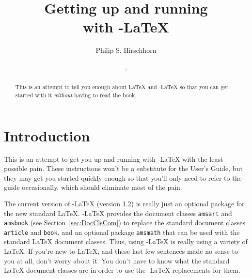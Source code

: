 \documentclass[12pt]{amsart}
\numberwithin{equation}{section}
\theoremstyle{plain} %
\theoremstyle{definition}
\theoremstyle{remark}
\begin{document}
\title[Running \AmS-\LaTeX]
{Getting up and running\\
with \AmS-\LaTeX}

\author{Philip S. Hirschhorn}

\address{Department of Mathematics\\
         Wellesley College\\
         Wellesley, Massachusetts 02481}



\date{\filedate, \fileversion}


\begin{abstract}
  This is an attempt to tell you enough about \LaTeX{} and
  \AmS-\LaTeX{} so that you can get started with it \emph{without}
  having to read the book.
\end{abstract}

\maketitle




\tableofcontents
\section{Introduction}

This is an attempt to get you up and running with \AmS-\LaTeX{} with
the least possible pain.  These instructions won't be a substitute for
the User's Guide, but they may get you started quickly enough so that
you'll only need to refer to the guide occasionally, which should
eliminate most of the pain.

The current version of \AmS-\LaTeX{} (version 1.2) is really just an
optional package for the new standard \LaTeX.  \AmS-\LaTeX{} provides
the document classes \verb"amsart" and \verb"amsbook" (see
Section~\ref{sec:DocClsCom}) to replace the standard document classes
\verb"article" and \verb"book", and an optional package \verb"amsmath"
that can be used with the standard \LaTeX{} document classes.  Thus,
using \AmS-\LaTeX{} is really using a variety of \LaTeX.  If you're
new to \LaTeX{}, and these last few sentences made no sense to you at
all, don't worry about it.  You don't have to know what the standard
\LaTeX{} document classes are in order to use the \AmS-\LaTeX{}
replacements for them.
\end{document}
